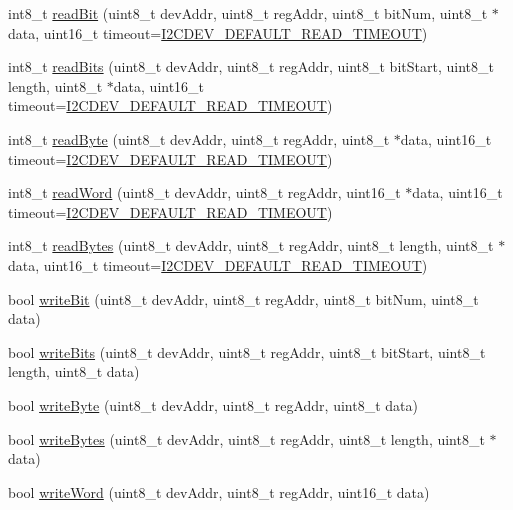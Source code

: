 \begin{DoxyCompactItemize}
\item 
int8\+\_\+t \mbox{\hyperlink{classI2Cdev_ab028a4f330f4f31dc8af9890431a2a63}{read\+Bit}} (uint8\+\_\+t dev\+Addr, uint8\+\_\+t reg\+Addr, uint8\+\_\+t bit\+Num, uint8\+\_\+t $\ast$data, uint16\+\_\+t timeout=\mbox{\hyperlink{I2Cdev_8h_ad9726bb02451bb8f59d3d2729e4cd20e}{I2\+C\+D\+E\+V\+\_\+\+D\+E\+F\+A\+U\+L\+T\+\_\+\+R\+E\+A\+D\+\_\+\+T\+I\+M\+E\+O\+UT}})
\item 
int8\+\_\+t \mbox{\hyperlink{classI2Cdev_a362d1d9bf44d01f0dfd7db94df8a61e5}{read\+Bits}} (uint8\+\_\+t dev\+Addr, uint8\+\_\+t reg\+Addr, uint8\+\_\+t bit\+Start, uint8\+\_\+t length, uint8\+\_\+t $\ast$data, uint16\+\_\+t timeout=\mbox{\hyperlink{I2Cdev_8h_ad9726bb02451bb8f59d3d2729e4cd20e}{I2\+C\+D\+E\+V\+\_\+\+D\+E\+F\+A\+U\+L\+T\+\_\+\+R\+E\+A\+D\+\_\+\+T\+I\+M\+E\+O\+UT}})
\item 
int8\+\_\+t \mbox{\hyperlink{classI2Cdev_a80bf7daa6a6c34df95de78ac54d01b1f}{read\+Byte}} (uint8\+\_\+t dev\+Addr, uint8\+\_\+t reg\+Addr, uint8\+\_\+t $\ast$data, uint16\+\_\+t timeout=\mbox{\hyperlink{I2Cdev_8h_ad9726bb02451bb8f59d3d2729e4cd20e}{I2\+C\+D\+E\+V\+\_\+\+D\+E\+F\+A\+U\+L\+T\+\_\+\+R\+E\+A\+D\+\_\+\+T\+I\+M\+E\+O\+UT}})
\item 
int8\+\_\+t \mbox{\hyperlink{classI2Cdev_af62cd3a62562c704c6f183ea7a42064d}{read\+Word}} (uint8\+\_\+t dev\+Addr, uint8\+\_\+t reg\+Addr, uint16\+\_\+t $\ast$data, uint16\+\_\+t timeout=\mbox{\hyperlink{I2Cdev_8h_ad9726bb02451bb8f59d3d2729e4cd20e}{I2\+C\+D\+E\+V\+\_\+\+D\+E\+F\+A\+U\+L\+T\+\_\+\+R\+E\+A\+D\+\_\+\+T\+I\+M\+E\+O\+UT}})
\item 
int8\+\_\+t \mbox{\hyperlink{classI2Cdev_ab1ba3954fcc16341aa6e04e0a569c0ea}{read\+Bytes}} (uint8\+\_\+t dev\+Addr, uint8\+\_\+t reg\+Addr, uint8\+\_\+t length, uint8\+\_\+t $\ast$data, uint16\+\_\+t timeout=\mbox{\hyperlink{I2Cdev_8h_ad9726bb02451bb8f59d3d2729e4cd20e}{I2\+C\+D\+E\+V\+\_\+\+D\+E\+F\+A\+U\+L\+T\+\_\+\+R\+E\+A\+D\+\_\+\+T\+I\+M\+E\+O\+UT}})
\item 
bool \mbox{\hyperlink{classI2Cdev_aa68890af87de5471d32e583ebbd91acb}{write\+Bit}} (uint8\+\_\+t dev\+Addr, uint8\+\_\+t reg\+Addr, uint8\+\_\+t bit\+Num, uint8\+\_\+t data)
\item 
bool \mbox{\hyperlink{classI2Cdev_a913371251b6a41520c080115650e1b59}{write\+Bits}} (uint8\+\_\+t dev\+Addr, uint8\+\_\+t reg\+Addr, uint8\+\_\+t bit\+Start, uint8\+\_\+t length, uint8\+\_\+t data)
\item 
bool \mbox{\hyperlink{classI2Cdev_aeb297637ef985cd562da465ba61b7042}{write\+Byte}} (uint8\+\_\+t dev\+Addr, uint8\+\_\+t reg\+Addr, uint8\+\_\+t data)
\item 
bool \mbox{\hyperlink{classI2Cdev_aa4e39cac6c0eac5112f9132084bcc93e}{write\+Bytes}} (uint8\+\_\+t dev\+Addr, uint8\+\_\+t reg\+Addr, uint8\+\_\+t length, uint8\+\_\+t $\ast$data)
\item 
bool \mbox{\hyperlink{classI2Cdev_acbe68a802d6a177301736e60bedd1def}{write\+Word}} (uint8\+\_\+t dev\+Addr, uint8\+\_\+t reg\+Addr, uint16\+\_\+t data)
\end{DoxyCompactItemize}
